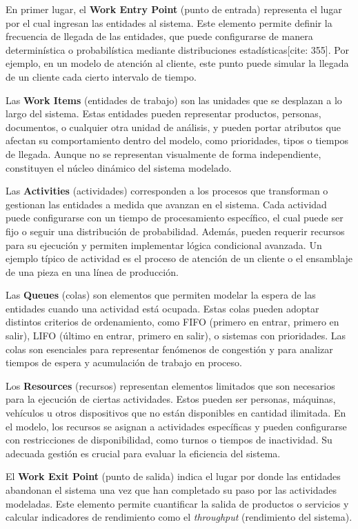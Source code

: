 \documentclass[runningheads]{llncs}
\begin{document}
\noindent En primer lugar, el \textbf{Work Entry Point} (punto de entrada) representa el lugar por el cual ingresan las entidades al sistema. Este elemento permite definir la frecuencia de llegada de las entidades, que puede configurarse de manera determinística o probabilística mediante distribuciones estadísticas[cite: 355]. Por ejemplo, en un modelo de atención al cliente, este punto puede simular la llegada de un cliente cada cierto intervalo de tiempo.

Las \textbf{Work Items} (entidades de trabajo) son las unidades que se desplazan a lo largo del sistema. Estas entidades pueden representar productos, personas, documentos, o cualquier otra unidad de análisis, y pueden portar atributos que afectan su comportamiento dentro del modelo, como prioridades, tipos o tiempos de llegada. Aunque no se representan visualmente de forma independiente, constituyen el núcleo dinámico del sistema modelado.

Las \textbf{Activities} (actividades) corresponden a los procesos que transforman o gestionan las entidades a medida que avanzan en el sistema. Cada actividad puede configurarse con un tiempo de procesamiento específico, el cual puede ser fijo o seguir una distribución de probabilidad. Además, pueden requerir recursos para su ejecución y permiten implementar lógica condicional avanzada. Un ejemplo típico de actividad es el proceso de atención de un cliente o el ensamblaje de una pieza en una línea de producción.

Las \textbf{Queues} (colas) son elementos que permiten modelar la espera de las entidades cuando una actividad está ocupada. Estas colas pueden adoptar distintos criterios de ordenamiento, como FIFO (primero en entrar, primero en salir), LIFO (último en entrar, primero en salir), o sistemas con prioridades. Las colas son esenciales para representar fenómenos de congestión y para analizar tiempos de espera y acumulación de trabajo en proceso.

Los \textbf{Resources} (recursos) representan elementos limitados que son necesarios para la ejecución de ciertas actividades. Estos pueden ser personas, máquinas, vehículos u otros dispositivos que no están disponibles en cantidad ilimitada. En el modelo, los recursos se asignan a actividades específicas y pueden configurarse con restricciones de disponibilidad, como turnos o tiempos de inactividad. Su adecuada gestión es crucial para evaluar la eficiencia del sistema.

El \textbf{Work Exit Point} (punto de salida) indica el lugar por donde las entidades abandonan el sistema una vez que han completado su paso por las actividades modeladas. Este elemento permite cuantificar la salida de productos o servicios y calcular indicadores de rendimiento como el \textit{throughput} (rendimiento del sistema).
\end{document}
